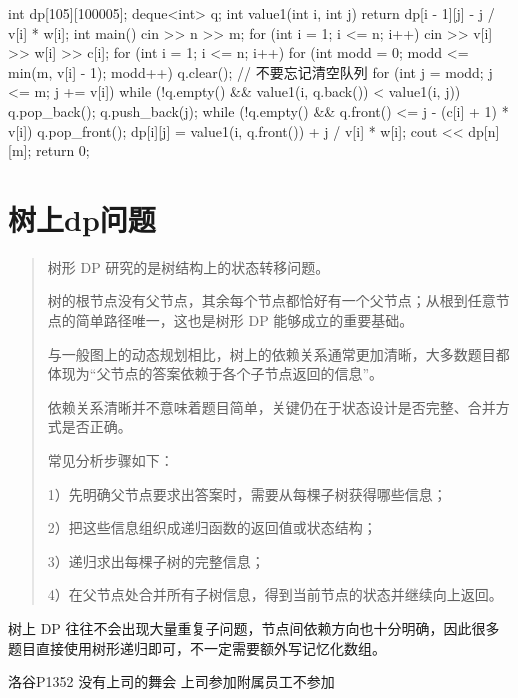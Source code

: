 \documentclass[UTF8,a4paper,11pt]{ctexart}
\newcommand{\topic}[1]{%
  \par\needspace{3\baselineskip}\vspace{0.45em}%
  \noindent{\bfseries\color{Primary}#1}\par\vspace{0.12em}%
}
\begin{document}
\begin{CodeBlock}
int dp[105][100005];
deque<int> q;
int value1(int i, int j) {
    return dp[i - 1][j] - j / v[i] * w[i];
}
int main() {
    cin >> n >> m;
    for (int i = 1; i <= n; i++)
        cin >> v[i] >> w[i] >> c[i];
    for (int i = 1; i <= n; i++) {
        for (int modd = 0; modd <= min(m, v[i] - 1); modd++) {
            q.clear(); // 不要忘记清空队列
            for (int j = modd; j <= m; j += v[i]) {
                while (!q.empty() && value1(i, q.back()) < value1(i, j))
                    q.pop_back();
                q.push_back(j);
                while (!q.empty() && q.front() <= j - (c[i] + 1) * v[i])
                    q.pop_front();
                dp[i][j] = value1(i, q.front()) + j / v[i] * w[i];
            }
        }
    }
    cout << dp[n][m];
    return 0;
}
\end{CodeBlock}

\section{树上dp问题}

\topic{树形 DP 套路}

\begin{quote}
树形 DP 研究的是树结构上的状态转移问题。\par
树的根节点没有父节点，其余每个节点都恰好有一个父节点；从根到任意节点的简单路径唯一，这也是树形 DP 能够成立的重要基础。\par
与一般图上的动态规划相比，树上的依赖关系通常更加清晰，大多数题目都体现为“父节点的答案依赖于各个子节点返回的信息”。\par
依赖关系清晰并不意味着题目简单，关键仍在于状态设计是否完整、合并方式是否正确。\par
\smallskip
常见分析步骤如下：\par
1）先明确父节点要求出答案时，需要从每棵子树获得哪些信息；\par
2）把这些信息组织成递归函数的返回值或状态结构；\par
3）递归求出每棵子树的完整信息；\par
4）在父节点处合并所有子树信息，得到当前节点的状态并继续向上返回。\par
\end{quote}

树上 DP 往往不会出现大量重复子问题，节点间依赖方向也十分明确，因此很多题目直接使用树形递归即可，不一定需要额外写记忆化数组。

洛谷P1352 没有上司的舞会 上司参加附属员工不参加
\end{document}
